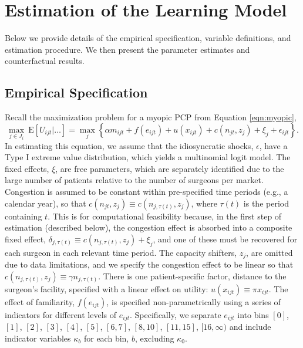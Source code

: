 \documentclass[12pt]{article}
\begin{document}

\section{Estimation of the Learning Model}
\label{sec:structural}

Below we provide details of the empirical specification, variable definitions, and estimation procedure. We then present the parameter estimates and counterfactual results.

\subsection{Empirical Specification}
\label{sec:emp-specification}

Recall the maximization problem for a myopic PCP from Equation \eqref{eqn:myopic},
\begin{equation*}
\max_{j \in J_i} \ \text{E} \left[ U_{ijt} | \dots \right]
= \max_j \left\{ \alpha m_{ijt} + f(e_{ijt}) + u(x_{ijt}) + c(n_{jt}, z_j) + \xi_j + \epsilon_{ijt} \right\} .
\end{equation*}
In estimating this equation, we assume that the idiosyncratic shocks, $\epsilon$, have a Type I extreme value distribution, which yields a multinomial logit model. The fixed effects, $\xi$, are free parameters, which are separately identified due to the large number of patients relative to the number of surgeons per market. Congestion is assumed to be constant within pre-specified time periods (e.g., a calendar year), so that $c(n_{jt}, z_j) \equiv c(n_{j, \tau(t)}, z_j)$, where $\tau(t)$ is the period containing $t$. This is for computational feasibility because, in the first step of estimation (described below), the congestion effect is  absorbed into a composite fixed effect, $\delta_{j, \tau(t)} \equiv c(n_{j, \tau(t)}, z_j) + \xi_{j}$, and one of these must be recovered for each surgeon in each relevant time period. The capacity shifters, $z_j$, are omitted due to data limitations, and we specify the congestion effect to be linear so that $c(n_{j, \tau(t)}, z_j) \equiv \gamma n_{j, \tau(t)}$. There is one patient-specific factor, distance to the surgeon's facility, specified with a linear effect on utility: $u(x_{ijt}) \equiv \pi x_{ijt}$. The effect of familiarity, $f(e_{ijt})$, is specified non-parametrically using a series of indicators for different levels of $e_{ijt}$. Specifically, we separate $e_{ijt}$ into bins $[0]$, $[1]$, $[2]$, $[3]$, $[4]$, $[5]$, $[6,7]$, $[8,10]$, $[11,15]$, $[16,\infty)$ and include indicator variables $\kappa_{b}$ for each bin, $b$, excluding $\kappa_{0}$.
\end{document}

